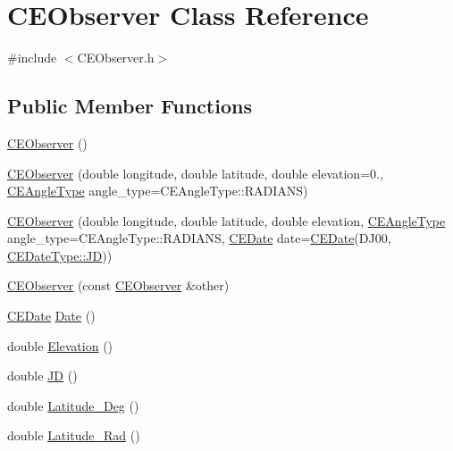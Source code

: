 \hypertarget{class_c_e_observer}{}\section{C\+E\+Observer Class Reference}
\label{class_c_e_observer}


{\ttfamily \#include $<$C\+E\+Observer.\+h$>$}

\subsection*{Public Member Functions}
\begin{DoxyCompactItemize}
\item 
\hyperlink{class_c_e_observer_a3fb13fd8748f8c7843699653bbcef023}{C\+E\+Observer} ()
\item 
\hyperlink{class_c_e_observer_ad6e0b646e01fdddec132689723bda78c}{C\+E\+Observer} (double longitude, double latitude, double elevation=0., \hyperlink{namespace_cpp_ephem_a9a974f6ccf329e8cb5f9208b725f15ef}{C\+E\+Angle\+Type} angle\+\_\+type=C\+E\+Angle\+Type\+::\+R\+A\+D\+I\+A\+N\+S)
\item 
\hyperlink{class_c_e_observer_a2d89d3686c049313eb2e6dbec82a2737}{C\+E\+Observer} (double longitude, double latitude, double elevation, \hyperlink{namespace_cpp_ephem_a9a974f6ccf329e8cb5f9208b725f15ef}{C\+E\+Angle\+Type} angle\+\_\+type=C\+E\+Angle\+Type\+::\+R\+A\+D\+I\+A\+N\+S, \hyperlink{class_c_e_date}{C\+E\+Date} date=\hyperlink{class_c_e_date}{C\+E\+Date}(D\+J00, \hyperlink{_c_e_date_8h_aa6b826beca26b0712061a4afc5ad7746aabf8d7515962e526421842e8456798cc}{C\+E\+Date\+Type\+::\+J\+D}))
\item 
\hyperlink{class_c_e_observer_abed8a7df1b32b448e723166bc5e53a64}{C\+E\+Observer} (const \hyperlink{class_c_e_observer}{C\+E\+Observer} \&other)
\item 
\hyperlink{class_c_e_date}{C\+E\+Date} \hyperlink{class_c_e_observer_a7830e2317c65937e2998b07c334f96cd}{Date} ()
\item 
double \hyperlink{class_c_e_observer_a04aa1b4f4709b9bf340fc0bd15c831c6}{Elevation} ()
\item 
double \hyperlink{class_c_e_observer_a94ea5d05a24a1a8f96f576498c42da09}{J\+D} ()
\item 
double \hyperlink{class_c_e_observer_a71deb782773065b146e76f6f0d9a31e5}{Latitude\+\_\+\+Deg} ()
\item 
double \hyperlink{class_c_e_observer_a1e1053a2cb4fa013965f0012bc9ec2ed}{Latitude\+\_\+\+Rad} ()
\item 

\end{DoxyCompactItemize}
